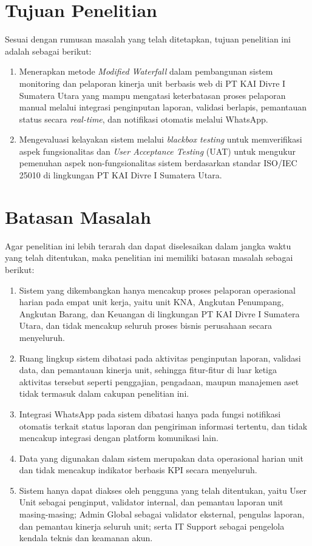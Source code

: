 \section{Tujuan Penelitian} \label{I.Tujuan}
Sesuai dengan rumusan masalah yang telah ditetapkan, tujuan penelitian ini adalah sebagai berikut:
\begin{enumerate}[noitemsep]
    \item Menerapkan metode \textit{Modified Waterfall} dalam pembangunan sistem monitoring dan pelaporan kinerja unit berbasis web di PT KAI Divre I Sumatera Utara yang mampu mengatasi keterbatasan proses pelaporan manual melalui integrasi penginputan laporan, validasi berlapis, pemantauan status secara \textit{real-time}, dan notifikasi otomatis melalui WhatsApp.
    \item Mengevaluasi kelayakan sistem melalui \textit{blackbox testing} untuk memverifikasi aspek fungsionalitas dan \textit{User Acceptance Testing} (UAT) untuk mengukur pemenuhan aspek non-fungsionalitas sistem berdasarkan standar ISO/IEC 25010 di lingkungan PT KAI Divre I Sumatera Utara.
\end{enumerate}

\section{Batasan Masalah} \label{I.Batasan}
Agar penelitian ini lebih terarah dan dapat diselesaikan dalam jangka waktu yang telah ditentukan, maka penelitian ini memiliki batasan masalah sebagai berikut:
\begin{enumerate}[noitemsep]
    \item Sistem yang dikembangkan hanya mencakup proses pelaporan operasional harian pada empat unit kerja, yaitu unit KNA, Angkutan Penumpang, Angkutan Barang, dan Keuangan di lingkungan PT KAI Divre I Sumatera Utara, dan tidak mencakup seluruh proses bisnis perusahaan secara menyeluruh.
    \item Ruang lingkup sistem dibatasi pada aktivitas penginputan laporan, validasi data, dan pemantauan kinerja unit, sehingga fitur-fitur di luar ketiga aktivitas tersebut seperti penggajian, pengadaan, maupun manajemen aset tidak termasuk dalam cakupan penelitian ini.
    \item Integrasi WhatsApp pada sistem dibatasi hanya pada fungsi notifikasi otomatis terkait status laporan dan pengiriman informasi tertentu, dan tidak mencakup integrasi dengan platform komunikasi lain.
    \item Data yang digunakan dalam sistem merupakan data operasional harian unit dan tidak mencakup indikator berbasis KPI secara menyeluruh.
    \item Sistem hanya dapat diakses oleh pengguna yang telah ditentukan, yaitu User Unit sebagai penginput, validator internal, dan pemantau laporan unit masing-masing; Admin Global sebagai validator eksternal, pengulas laporan, dan pemantau kinerja seluruh unit; serta IT Support sebagai pengelola kendala teknis dan keamanan akun.
\end{enumerate}

